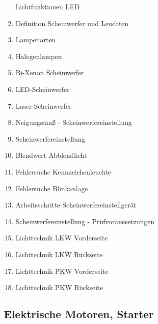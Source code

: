 \begin{enumerate}
  Lichtfunktionen LED\\
\item
  Definition Scheinwerfer und Leuchten\\
\item
  Lampenarten\\
\item
  Halogenlampen\\
\item
  Bi-Xenon Scheinwerfer\\
\item
  LED-Scheinwerfer\\
\item
  Laser-Scheinwerfer\\
\item
  Neigungsmaß - Scheinwerfereinstellung\\
\item
  Scheinwerfereinstellung\\
\item
  Blendwert Abblendlicht\\
\item
  Fehlersuche Kennzeichenleuchte\\
\item
  Fehlersuche Blinkanlage\\
\item
  Arbeitsschritte Scheinwerfereinstellgerät\\
\item
  Scheinwerfereinstellung - Prüfvoraussetzungen\\
\item
  Lichttechnik LKW Vorderseite\\
\item
  Lichttechnik LKW Rückseite\\
\item
  Lichttechnik PKW Vorderseite\\
\item
  Lichttechnik PKW Rückseite
\end{enumerate}

\subsection{Elektrische Motoren,
Starter}\label{elektrische-motoren-starter}


